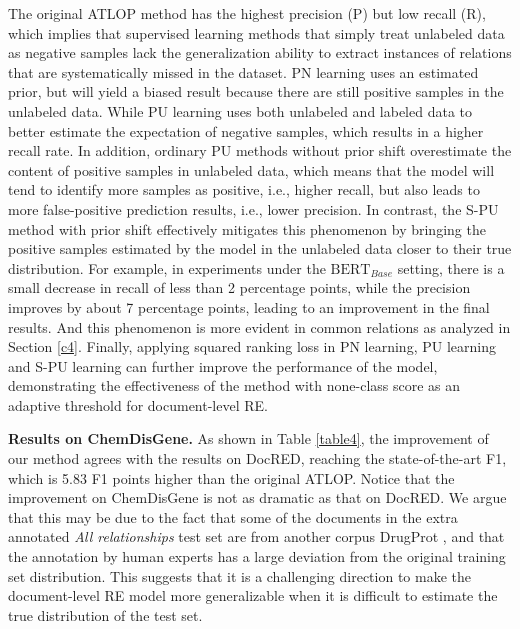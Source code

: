 \documentclass[11pt]{article}
\begin{document}
The original ATLOP method has the highest precision (P) but low recall (R), which implies that supervised learning methods that simply treat unlabeled data as negative samples lack the generalization ability to extract instances of relations that are systematically missed in the dataset. PN learning uses an estimated prior, but will yield a biased result because there are still positive samples in the unlabeled data. While PU learning uses both unlabeled and labeled data to better estimate the expectation of negative samples, which results in a higher recall rate. In addition, ordinary PU methods without prior shift overestimate the content of positive samples in unlabeled data, which means that the model will tend to identify more samples as positive, i.e., higher recall, but also leads to more false-positive prediction results, i.e., lower precision. In contrast, the S-PU method with prior shift effectively mitigates this phenomenon by bringing the positive samples estimated by the model in the unlabeled data closer to their true distribution. For example, in experiments under the $\mathrm{BERT}_{Base}$ setting, there is a small decrease in recall of less than 2 percentage points, while the precision improves by about 7 percentage points, leading to an improvement in the final results. And this phenomenon is more evident in common relations as analyzed in Section \ref{c4}. Finally, applying squared ranking loss in PN learning, PU learning and S-PU learning can further improve the performance of the model, demonstrating the effectiveness of the method with none-class score as an adaptive threshold for document-level RE.

\textbf{Results on ChemDisGene.}
As shown in Table \ref{table4}, the improvement of our method agrees with the results on DocRED, reaching the state-of-the-art F1, which is 5.83 F1 points higher than the original ATLOP. Notice that the improvement on ChemDisGene is not as dramatic as that on DocRED. We argue that this may be due to the fact that some of the documents in the extra annotated \emph{All relationships} test set are from another corpus DrugProt \citep{miranda2021overview}, and that the annotation by human experts has a large deviation from the original training set distribution. This suggests that it is a challenging direction to make the document-level RE model more generalizable when it is difficult to estimate the true distribution of the test set.
\end{document}
